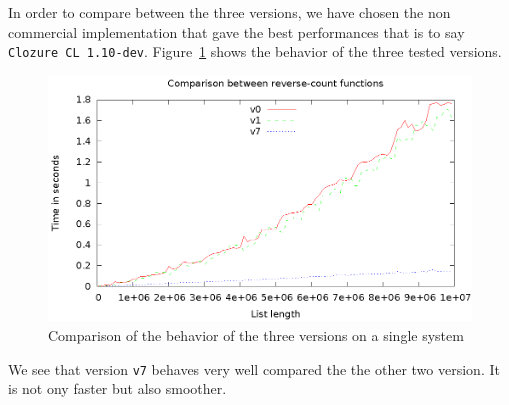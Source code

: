 In order to compare between the three versions, we have chosen the non commercial implementation
that gave the best performances that is to say \texttt{Clozure CL 1.10-dev}.
Figure~\ref{f-versions} shows the behavior of the three tested versions.

\begin{figure}[htb]
\centering
\includegraphics{v0-v1-v7.eps}
\caption{\label{f-versions} Comparison of the behavior of the three versions on a single system}
\end{figure}

We see that version \texttt{v7} behaves very well compared the the other two version.
It is not ony faster but also smoother.

